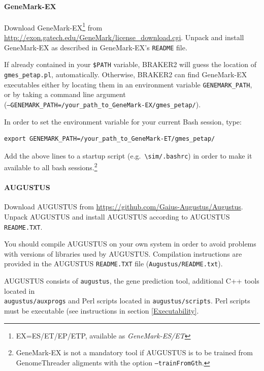 \documentclass[]{article}
\let\oldparagraph\paragraph
\renewcommand{\paragraph}[1]{\oldparagraph{#1}\mbox{}}
\begin{document}
\paragraph{GeneMark-EX}\label{genemark-ex}

Download GeneMark-EX\footnote{EX=ES/ET/EP/ETP, available as
  \emph{GeneMark-ES/ET}} from
\url{http://exon.gatech.edu/GeneMark/license_download.cgi}. Unpack and
install GeneMark-EX as described in GeneMark-EX's \texttt{README} file.

If already contained in your \texttt{\$PATH} variable, BRAKER2 will
guess the location of \texttt{gmes\_petap.pl}, automatically. Otherwise,
BRAKER2 can find GeneMark-EX executables either by locating them in an
environment variable \texttt{GENEMARK\_PATH}, or by taking a command
line argument\\
(\texttt{–GENEMARK\_PATH=/your\_path\_to\_GeneMark-EX/gmes\_petap/}).

In order to set the environment variable for your current Bash session,
type:

\begin{verbatim}
export GENEMARK_PATH=/your_path_to_GeneMark-ET/gmes_petap/
\end{verbatim}

Add the above lines to a startup script
(e.g.~\texttt{\textbackslash{}sim/.bashrc}) in order to make it
available to all bash sessions.\footnote{GeneMark-EX is not a mandatory
  tool if AUGUSTUS is to be trained from GenomeThreader aligments with
  the option \texttt{–trainFromGth}.}

\paragraph{AUGUSTUS}\label{augustus}

Download AUGUSTUS from \url{https://github.com/Gaius-Augustus/Augustus}.
Unpack AUGUSTUS and install AUGUSTUS according to AUGUSTUS
\texttt{README.TXT}.

You should compile AUGUSTUS on your own system in order to avoid
problems with versions of libraries used by AUGUSTUS. Compilation
instructions are provided in the AUGUSTUS \texttt{README.TXT} file
(\texttt{Augustus/README.txt}).

AUGUSTUS consists of \texttt{augustus}, the gene prediction tool,
additional C++ tools located in\\
\texttt{augustus/auxprogs} and Perl scripts located in
\texttt{augustus/scripts}. Perl scripts must be executable (see
instructions in section \ref{Executability}.
\end{document}

